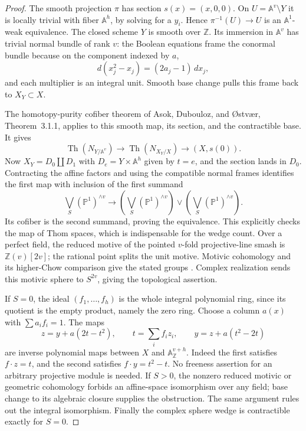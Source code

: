 \begin{proof}
The smooth projection $\pi$ has section $s(x)=(x,0,0)$. On $U=\mathbb A^v\setminus Y$ it is locally trivial with fiber $\mathbb A^h$, by solving for a $y_i$. Hence $\pi^{-1}(U)\to U$ is an $\mathbb A^1$-weak equivalence. The closed scheme $Y$ is smooth over $\mathbb Z$. Its immersion in $\mathbb A^v$ has trivial normal bundle of rank $v$: the Boolean equations frame the conormal bundle because on the component indexed by $a$,
\[
 d(x_j^2-x_j)=(2a_j-1)\,dx_j,
\]
and each multiplier is an integral unit. Smooth base change pulls this frame back to $X_Y\subset X$.

The homotopy-purity cofiber theorem of Asok, Dubouloz, and \O stv\ae r, Theorem~3.1.1, applies to this smooth map, its section, and the contractible base. It gives
\[
 \operatorname{Th}(N_{Y/\mathbb A^v})\longrightarrow
 \operatorname{Th}(N_{X_Y/X})\longrightarrow(X,s(0)).
\]
Now $X_Y=D_0\amalg D_1$ with $D_e=Y\times\mathbb A^h$ given by $t=e$, and the section lands in $D_0$. Contracting the affine factors and using the compatible normal frames identifies the first map with inclusion of the first summand
\[
 \bigvee_S(\mathbb P^1)^{\wedge v}\longrightarrow
 \left(\bigvee_S(\mathbb P^1)^{\wedge v}\right)
 \vee\left(\bigvee_S(\mathbb P^1)^{\wedge v}\right).
\]
Its cofiber is the second summand, proving the equivalence. This explicitly checks the map of Thom spaces, which is indispensable for the wedge count. Over a perfect field, the reduced motive of the pointed $v$-fold projective-line smash is $\mathbb Z(v)[2v]$; the rational point splits the unit motive. Motivic cohomology and its higher-Chow comparison give the stated groups \cite[Theorem~19.1, p.~159]{ff-mvw}. Complex realization sends this motivic sphere to $S^{2v}$, giving the topological assertion.

If $S=0$, the ideal $(f_1,\ldots,f_h)$ is the whole integral polynomial ring, since its quotient is the empty product, namely the zero ring. Choose a column $a(x)$ with $\sum a_if_i=1$. The maps
\[
 z=y+a(2t-t^2),\qquad
 t=\sum_i f_i z_i,\qquad y=z+a(t^2-2t)
\]
are inverse polynomial maps between $X$ and $\mathbb A^{v+h}_{\mathbb Z}$. Indeed the first satisfies $f\cdot z=t$, and the second satisfies $f\cdot y=t^2-t$. No freeness assertion for an arbitrary projective module is needed. If $S>0$, the nonzero reduced motivic or geometric cohomology forbids an affine-space isomorphism over any field; base change to its algebraic closure supplies the obstruction. The same argument rules out the integral isomorphism. Finally the complex sphere wedge is contractible exactly for $S=0$.
\end{proof}

